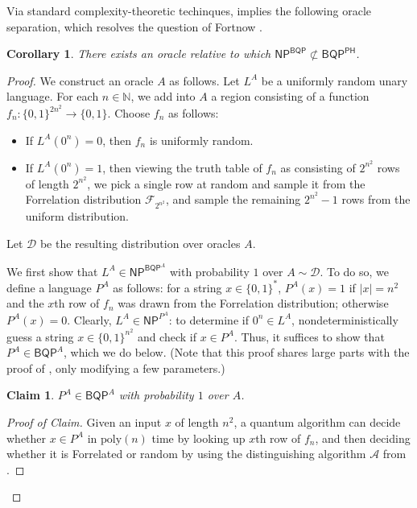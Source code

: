 \documentclass[10pt,a4paper]{article}
\newtheorem{claim}[theorem]{Claim}
\newtheorem{corollary}[theorem]{Corollary}
\newcommand{\Naturals}{\mathbb{N}}
\newcommand{\poly}{\mathrm{poly}}
\begin{document}
Via standard complexity-theoretic techinques,  implies the following oracle separation, which resolves the question of Fortnow \cite{For05}.

\begin{corollary}
\label{cor:np^bqp_not_in_bqp^ph}
There exists an oracle relative to which $\mathsf{NP}^{\mathsf{BQP}%
}\not \subset \mathsf{BQP}^{\mathsf{PH}}$.
\end{corollary}

\begin{proof}
We construct an oracle $A$ as follows. Let $L^A$ be a uniformly random unary language. For each $n \in \Naturals$, we add into $A$ a region consisting of a function $f_n: \{0,1\}^{2n^2} \to \{0,1\}$. Choose $f_n$ as follows:
\begin{itemize}
\item If $L^A\left(0^n\right) = 0$, then $f_n$ is uniformly random.
\item If $L^A\left(0^n\right) = 1$, then viewing the truth table of $f_n$ as consisting of $2^{n^2}$ rows of length $2^{n^2}$, we pick a single row at random and sample it from the Forrelation distribution $\mathcal{F}_{2^{n^2}}$, and sample the remaining $2^{n^2} - 1$ rows from the uniform distribution.
\end{itemize}
Let $\mathcal{D}$ be the resulting distribution over oracles $A$.

We first show that $L^A \in \mathsf{NP}^{\mathsf{BQP}^A}$ with probability $1$ over $A \sim \mathcal{D}$. To do so, we define a language $P^A$ as follows: for a string $x \in \{0,1\}^*$, $P^A(x) = 1$ if $|x| = n^2$ and the $x$th row of $f_n$ was drawn from the Forrelation distribution; otherwise $P^A(x) = 0$. Clearly, $L^A \in \mathsf{NP}^{P^A}$: to determine if $0^n \in L^A$, nondeterministically guess a string $x \in \{0,1\}^{n^2}$ and check if $x \in P^A$. Thus, it suffices to show that $P^A \in \mathsf{BQP}^A$, which we do below. (Note that this proof shares large parts with the proof of , only modifying a few parameters.)

\begin{claim}
\label{claim:m_in_bqp_o}
$P^A \in \mathsf{BQP}^A$ with probability $1$ over $A$.
\end{claim}

\begin{proof}[Proof of Claim]
Given an input $x$ of length $n^2$, a quantum algorithm can decide whether $x \in P^A$ in $\poly(n)$ time by looking up $x$th row of $f_n$, and then deciding whether it is Forrelated or random by using the distinguishing algorithm $\mathcal{A}$ from .


\end{proof}
\end{proof}
\end{document}
